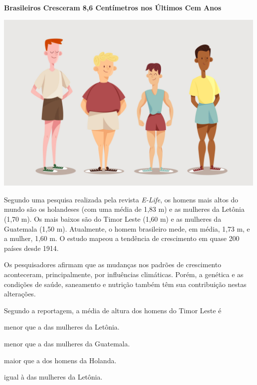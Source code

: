 \begin{myquote}
\textbf{Brasileiros Cresceram 8,6 Centímetros nos Últimos Cem Anos}

\begin{center}
\includegraphics[width=.8\textwidth]{media/image36c.jpeg}
\end{center}

Segundo uma pesquisa realizada pela revista \textit{E-Life}, os homens
mais altos do mundo são os holandeses (com uma média de 1,83 m) e as
mulheres da Letônia (1,70 m). Os mais baixos são do Timor Leste (1,60 m)
e as mulheres da Guatemala (1,50 m). Atualmente, o homem brasileiro mede, em média, 1,73 m, e a mulher, 1,60 m. O estudo mapeou a tendência de
crescimento em quase 200 países desde 1914.  

Os pesquisadores afirmam que as mudanças nos padrões de crescimento
aconteceram, principalmente, por influências climáticas. Porém, a 
genética e as condições de saúde, saneamento e nutrição também têm sua
contribuição nestas alterações.

\end{myquote}

Segundo a reportagem, a média de altura dos homens do Timor Leste é

\begin{escolha}
\item menor que a das mulheres da Letônia.

\item menor que a das mulheres da Guatemala.

\item maior que a dos homens da Holanda.

\item igual à das mulheres da Letônia.
\end{escolha}

